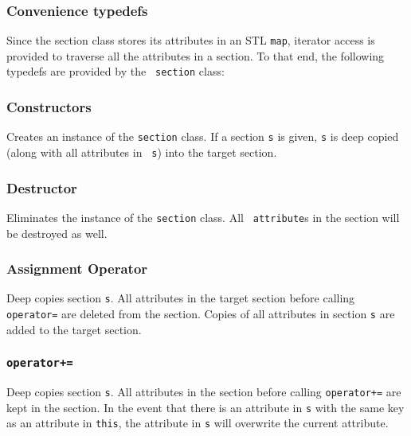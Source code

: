 \subsubsection{Convenience typedefs}

Since the section class stores its attributes in an STL {\tt map},
iterator access is provided to traverse all the attributes in a
section.  To that end, the following typedefs are provided by the {\tt
section} class:


\subsubsection{Constructors}


Creates an instance of the {\tt section} class.  If a section {\tt s}
is given, {\tt s} is deep copied (along with all attributes in {\tt
s}) into the target section.

\subsubsection{Destructor}


Eliminates the instance of the {\tt section} class.  All {\tt
attribute}s in the section will be destroyed as well.

\subsubsection{Assignment Operator}


Deep copies section {\tt s}.  All attributes in the target section
before calling {\tt operator=} are deleted from the section.  Copies
of all attributes in section {\tt s} are added to the target section.


\subsubsection[operator+=]{{\tt operator+=}}
\label{code:sec:op_pl_eq}


Deep copies section {\tt s}.  All attributes in the section before
calling {\tt operator+=} are kept in the section.  In the event that
there is an attribute in {\tt s} with the same key as an attribute in
{\tt this}, the attribute in {\tt s} will overwrite the current
attribute.


